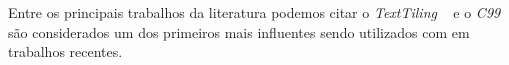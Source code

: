 Entre os principais trabalhos da literatura podemos citar o \textit{TextTiling} ~\cite{Hearst1994} e o \textit{C99}~\cite{Choi2000} são considerados um dos primeiros mais influentes sendo utilizados com  em trabalhos recentes.


% 















